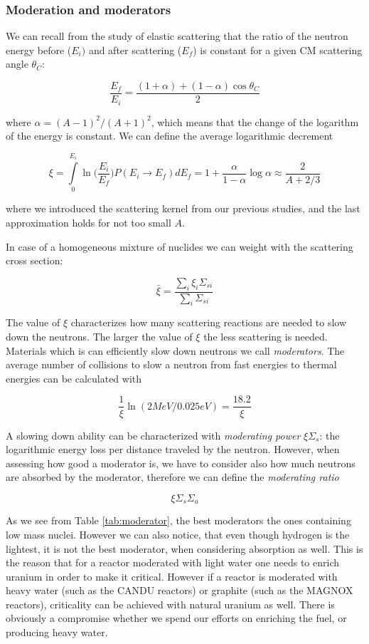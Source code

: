 \subsubsection{Moderation and moderators}

We can recall from the study of elastic scattering that the ratio of the neutron energy before ($E_i)$ and after scattering ($E_f$) is constant for a given CM scattering angle $\theta_C$:

\begin{equation}\label{eq:muErelation2}
\frac{E_f}{E_i}=\frac{(1+\alpha)+(1-\alpha)\cos\theta_C}{2}
\end{equation}

\noindent where $\alpha=(A-1)^2/(A+1)^2$, which means that the change of the logarithm of the energy is constant. We can define the average logarithmic decrement

\begin{equation}
\xi = \int\limits_0^{E_i}\ln\Big(\frac{E_i}{E_f}\Big)P(E_i\rightarrow E_f)dE_f=1+\frac{\alpha}{1-\alpha}\log\alpha \approx \frac{2}{A+2/3}
\end{equation}

\noindent where we introduced the scattering kernel from our previous studies, and the last approximation holds for not too small $A$.

In case of a homogeneous mixture of nuclides we can weight with the scattering cross section:

$$\bar\xi = \frac{\sum_i\xi_i\Sigma_{si}}{\sum_i\Sigma_{si}}$$

The value of $\xi$ characterizes how many scattering reactions are needed to slow down the neutrons. The larger the value of $\xi$ the less scattering is needed. Materials which is can efficiently slow down neutrons we call \textit{moderators}. The average number of collisions to slow a neutron from fast energies to thermal energies can be calculated with

$$\frac{1}{\xi}\ln(2 MeV/0.025 eV)=\frac{18.2}{\xi}$$

A slowing down ability can be characterized with \textit{moderating power} $\xi\Sigma_s$: the logarithmic energy loss per distance traveled by the neutron. However, when assessing how good a moderator is, we have to consider also how much neutrons are absorbed by the moderator, therefore we can define the \textit{moderating ratio}

$$\xi\Sigma_s\Sigma_a$$

\noindent As we see from Table \ref{tab:moderator}, the best moderators the ones containing low mass nuclei. However we can also notice, that even though hydrogen is the lightest, it is not the best moderator, when considering absorption as well. This is the reason that for a reactor moderated with light water one needs to enrich uranium in order to make it critical. However if a reactor is moderated with heavy water (such as the CANDU reactors) or graphite (such as the MAGNOX reactors), criticality can be achieved with natural uranium as well. There is obviously a compromise whether we spend our efforts on enriching the fuel, or producing heavy water. 


